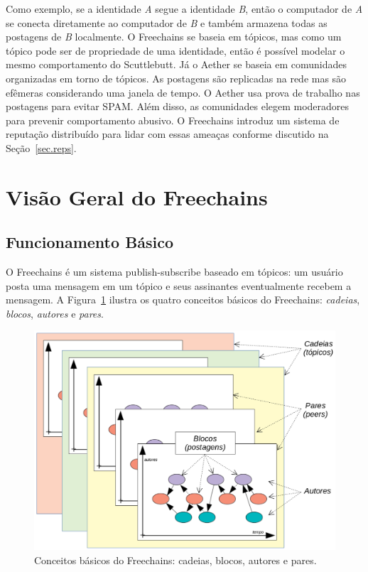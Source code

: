 \documentclass[12pt]{article}
\newcommand{\FC} {Freechains\xspace}
\begin{document}
Como exemplo, se a identidade \emph{A} segue a identidade \emph{B}, então o
computador de \emph{A} se conecta diretamente ao computador de \emph{B} e
também armazena todas as postagens de \emph{B} localmente.
O \FC se baseia em tópicos, mas como um tópico pode ser de propriedade de uma
identidade, então é possível modelar o mesmo comportamento do Scuttlebutt.
Já o Aether se baseia em comunidades organizadas em torno de tópicos.
As postagens são replicadas na rede mas são efêmeras considerando uma janela de
tempo.
O Aether usa prova de trabalho nas postagens para evitar SPAM.
Além disso, as comunidades elegem moderadores para prevenir comportamento
abusivo.
O \FC introduz um sistema de reputação distribuído para lidar com essas
ameaças conforme discutido na Seção~\ref{sec.reps}.

\section{Visão Geral do \FC}
\label{sec.freechains}

\subsection{Funcionamento Básico}

O \FC é um sistema publish-subscribe baseado em tópicos: um usuário
posta uma mensagem em um tópico e seus assinantes eventualmente recebem a
mensagem.
A Figura~\ref{fig.all} ilustra os quatro conceitos básicos do \FC:
\emph{cadeias}, \emph{blocos}, \emph{autores} e \emph{pares}.

\begin{figure}[ht]
\centering
\includegraphics[width=.65\textwidth]{all.png}
\caption{\scriptsize{Conceitos básicos do \FC: cadeias, blocos, autores e pares.}}
\label{fig.all}
\end{figure}
\end{document}
